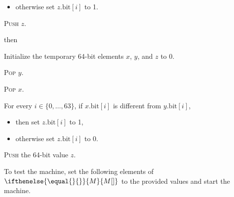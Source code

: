 \documentclass[a4paper,12pt]{article}
\newcommand{\num}[1]{\texttt{#1}}
\newcommand{\hex}[1]{\num{#1}_{\textup{\tiny 16}}}
\newcommand{\MEM}[1]{\ifthenelse{\equal{#1}{}}{M}{M[#1]}}
\newcommand{\bitno}[2]{#1.\mathrm{bit}[#2]}
\newcommand{\range}[2]{\{#1,\ldots,#2\}}
\newcommand{\proc}[1]{\textsc{#1}}
\newcommand{\op}[1]{$#1$}
\newcommand{\XOR}       [1]{\op{\hex{2B}}}
\begin{document}
\begin{stepnumbers}[start=3]
\begin{description}
\begin{stepnumbers}
\begin{itemize}[label=]
      \item otherwise set $\bitno{z}{i}$ to 1.
      \end{itemize}
    \item \proc{Push} $z$.
    \end{stepnumbers}
  \item[\XOR{}] then
    \begin{stepnumbers}
    \item Initialize the temporary 64-bit elements $x$, $y$, and $z$ to 0.
    \item \proc{Pop} $y$.
    \item \proc{Pop} $x$.
    \item For every $i \in \range{0}{63}$, if $\bitno{x}{i}$ is different from $\bitno{y}{i}$,
      \begin{itemize}[label=]
      \item then set $\bitno{z}{i}$ to 1,
      \item otherwise set $\bitno{z}{i}$ to 0.
      \end{itemize}
    \item \proc{Push} the 64-bit value $z$.
    \end{stepnumbers}
  \end{description}
\end{stepnumbers}
To test the machine, set the following elements of $\MEM{}$ to the provided values and start the machine.
\end{document}
